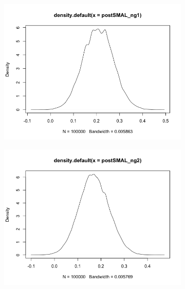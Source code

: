 \documentclass[mstat,12pt]{unswthesis}  %
\numberwithin{equation}{section}
\begin{document}
\begin{figure}[h]
\centering
\begin{subfigure}{.32\textwidth}
  \centering
  \includegraphics[width=\linewidth]{postSMALng1.png}  
  \label{fig:sub-first}
\end{subfigure}
\begin{subfigure}{.32\textwidth}
  \centering
  \includegraphics[width=\linewidth]{postSMALng2.png}  
  \label{fig:sub-second}
\end{subfigure}


\end{figure}
\end{document}
